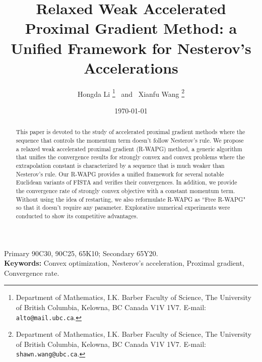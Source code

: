 \documentclass[12pt]{article}
\begin{document}
\title{{\selectfont
        Relaxed Weak Accelerated Proximal Gradient Method: a Unified Framework for Nesterov's Accelerations
    }}

\author{
    Hongda Li
    \thanks{Department of Mathematics, I.K. Barber Faculty of Science,
    The University of British Columbia, Kelowna, BC Canada V1V 1V7. E-mail:  \texttt{alto@mail.ubc.ca}.}~ and ~Xianfu Wang
    \thanks{Department of Mathematics, I.K. Barber Faculty of Science,
    The University of British Columbia, Kelowna, BC Canada V1V 1V7. E-mail:  \texttt{shawn.wang@ubc.ca}.}
}

\date{\today}

\maketitle


\begin{abstract}
    \noindent
    This paper is devoted to the study of accelerated proximal gradient methods where the sequence that controls the momentum term doesn't follow Nesterov's rule.
    We propose a relaxed weak accelerated proximal gradient (R-WAPG) method, a generic algorithm that unifies the convergence results for strongly convex and convex problems where the extrapolation constant is characterized by a sequence that is much weaker than Nesterov's rule.
    Our R-WAPG provides a unified framework for several notable Euclidean variants of FISTA and verifies their convergences.
    In addition, we provide the convergence rate of strongly convex objective with a constant momentum term.
    Without using the idea of restarting, we also reformulate R-WAPG as ``Free R-WAPG" so that it doesn't require any parameter.
    Explorative numerical experiments were conducted to show its competitive advantages.
\end{abstract}

Primary 90C30, 90C25, 65K10; Secondary 65Y20.
\\{\bfseries Keywords: }
Convex optimization, Nesterov's acceleration, Proximal gradient, Convergence rate.
\end{document}
